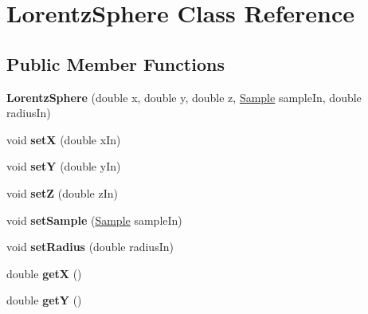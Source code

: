 \hypertarget{class_lorentz_sphere}{}\section{Lorentz\+Sphere Class Reference}
\label{class_lorentz_sphere}
\subsection*{Public Member Functions}
\begin{DoxyCompactItemize}
\item 
\mbox{\label{class_lorentz_sphere_a00145dd3c1b3cd744f856b0518264d44}} 
{\bfseries Lorentz\+Sphere} (double x, double y, double z, \mbox{\hyperlink{class_sample}{Sample}} sample\+In, double radius\+In)
\item 
\mbox{\label{class_lorentz_sphere_a7f5c281dcbdada41e5d7db5404dba8ab}} 
void {\bfseries setX} (double x\+In)
\item 
\mbox{\label{class_lorentz_sphere_a94384f19a95a2013058b7cdec527a96a}} 
void {\bfseries setY} (double y\+In)
\item 
\mbox{\label{class_lorentz_sphere_a17f74d7f14c98cd51a085814517d8628}} 
void {\bfseries setZ} (double z\+In)
\item 
\mbox{\label{class_lorentz_sphere_a66f1189716e125df1b32875e21eb311a}} 
void {\bfseries set\+Sample} (\mbox{\hyperlink{class_sample}{Sample}} sample\+In)
\item 
\mbox{\label{class_lorentz_sphere_a24e6213413e512ea209b1ecfaa074690}} 
void {\bfseries set\+Radius} (double radius\+In)
\item 
\mbox{\label{class_lorentz_sphere_a46ca3f3511a6a87723644d350fbb66ca}} 
double {\bfseries getX} ()
\item 
\mbox{\label{class_lorentz_sphere_adc58278b6a0c645e6e0c5fd25fd79126}} 
double {\bfseries getY} ()
\item 
\mbox{\label{class_lorentz_sphere_a5c195aa98a61f40c1c08ca1f9e5cb210}} 

\end{DoxyCompactItemize}
